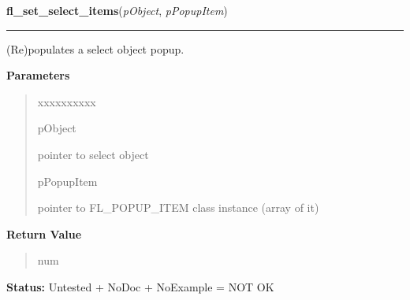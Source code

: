     \vspace{0.5ex}

\hspace{.8\funcindent}\begin{boxedminipage}{\funcwidth}

    \raggedright \textbf{fl\_set\_select\_items}(\textit{pObject}, \textit{pPopupItem})

    \vspace{-1.5ex}

    \rule{\textwidth}{0.5\fboxrule}
\setlength{\parskip}{2ex}
    (Re)populates a select object popup.

\setlength{\parskip}{1ex}
      \textbf{Parameters}
      \vspace{-1ex}

      \begin{quote}
        \begin{Ventry}{xxxxxxxxxx}

          \item[pObject]

          pointer to select object

          \item[pPopupItem]

          pointer to FL\_POPUP\_ITEM class instance (array of it)

        \end{Ventry}

      \end{quote}

      \textbf{Return Value}
    \vspace{-1ex}

      \begin{quote}
      num

      \end{quote}

\textbf{Status:} Untested + NoDoc + NoExample = NOT OK



    \end{boxedminipage}

    \label{xformslib:library:fl_get_select_popup}

    \vspace{0.5ex}

